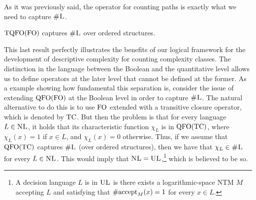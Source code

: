 As it was previously said, the operator for counting paths is exactly what we need to capture $\text{\sc \#L}$.
\begin{theorem} \label{tqfo-shl}
	${\rm TQFO}({\rm FO})$ captures $\text{\sc \#L}$ over ordered structures.
\end{theorem}
This last result 
perfectly 
illustrates the benefits of our logical framework for the development of descriptive complexity for counting %
complexity classes.  
The distinction in the language between the Boolean and the quantitative level allows us to define operators at the later level that cannot be defined at the former. 
As a example showing how fundamental this separation is, consider the issue of extending ${\rm QFO}({\rm FO})$ at the Boolean level in order to capture $\text{\sc \#L}$. The natural alternative to do this is to use ${\rm FO}$ extended with a transitive closure operator, which is denoted by ${\rm TC}$. But then the problem is that for every language $L \in \text{\sc NL}$, it holds that its characteristic function $\chi_L$ is in ${\rm QFO}({\rm TC})$, where $\chi_L(x) = 1$ if $x \in L$, and $\chi_L(x) = 0$ otherwise. Thus, if we assume that ${\rm QFO}({\rm TC})$ captures $\text{\sc \#L}$ (over ordered structures), then we have that $\chi_L \in \text{\sc \#L}$ for every $L \in \text{\sc NL}$. This would imply that $\text{\sc NL} = \text{\sc UL}$,\footnote{A decision language $L$ is in $\text{\sc UL}$ is there exists a logarithmic-space NTM $M$ accepting $L$ and satisfying that $\text{\rm \#accept}_M(x) = 1$ for every $x \in L$.} which is believed to be so\cite{Reinhardt97}.


